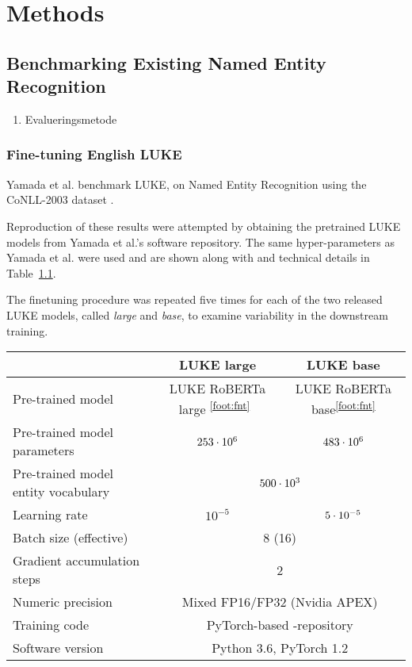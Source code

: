 \documentclass[main.tex]{subfiles}
\begin{document}
\chapter{Methods}

\section{Benchmarking Existing Named Entity Recognition}
\begin{enumerate}
    \item Evalueringsmetode
\end{enumerate}
\subsection{Fine-tuning English LUKE}
Yamada et al. benchmark LUKE, on Named Entity Recognition using the CoNLL-2003 dataset \cite{yamada2020luke}.

Reproduction of these results were attempted by obtaining the pretrained LUKE models from Yamada et al.'s software repository.
The same hyper-parameters as Yamada et al. were used and are shown along with and technical details in Table~\ref{tab:params}.

The finetuning procedure was repeated five times for each of the two released LUKE models, called \emph{large} and \emph{base}, to examine variability in the downstream training.
\addtocounter{footnote}{1}
\begin{table}[H]
    \begin{tabular}{l|cc}
                                    & LUKE large & LUKE base\\\hline
        Pre-trained model
                                    & LUKE RoBERTa large \textsuperscript{\ref{foot:fnt}}\
                                                & LUKE RoBERTa base\textsuperscript{\ref{foot:fnt}}\\
        Pre-trained model parameters & $253\cdot10^{6}$ & $483\cdot10^{6}$\\
        Pre-trained model entity vocabulary & \multicolumn{2}{c}{$500\cdot10^{3}$}\\
        Learning rate               & $10^{-5}$ & $5\cdot10^{-5}$\\
        Batch size (effective)      & \multicolumn{2}{c}{8 (16)}\\
        Gradient accumulation steps & \multicolumn{2}{c}{2}\\
        Numeric precision           & \multicolumn{2}{c}{Mixed FP16/FP32 (Nvidia APEX)}\\
        Training code               & \multicolumn{2}{c}{PyTorch-based \code{luke}-repository \protect\footnotemark}\\
        Software version            & \multicolumn{2}{c}{Python 3.6, PyTorch 1.2}
    \end{tabular}
    \label{tab:params}
\end{table}
\end{document}
